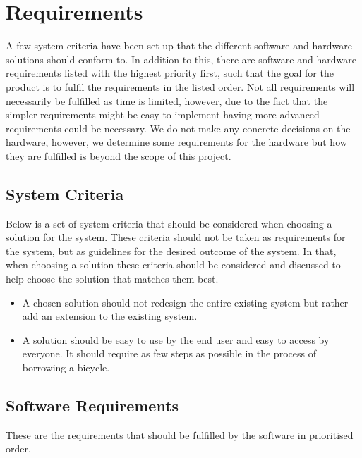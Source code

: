 \section{Requirements}
A few system criteria have been set up that the different software and hardware solutions should conform to. 
In addition to this, there are software and hardware requirements listed with the highest priority first, such that the goal for the product is to fulfil the requirements in the listed order. 
Not all requirements will necessarily be fulfilled as time is limited, however, due to the fact that the simpler requirements might be easy to implement having more advanced requirements could be necessary.
We do not make any concrete decisions on the hardware, however, we determine some requirements for the hardware but how they are fulfilled is beyond the scope of this project.

\subsection{System Criteria}
Below is a set of system criteria that should be considered when choosing a solution for the system.
These criteria should not be taken as requirements for the system, but as guidelines for the desired outcome of the system.
In that, when choosing a solution these criteria should be considered and discussed to help choose the solution that matches them best.

\begin{itemize}
	\item A chosen solution should not redesign the entire existing system but rather add an extension to the existing system.
	\item A solution should be easy to use by the end user and easy to access by everyone. 
	It should require as few steps as possible in the process of borrowing a bicycle.
\end{itemize}

\subsection{Software Requirements}
These are the requirements that should be fulfilled by the software in prioritised order.

